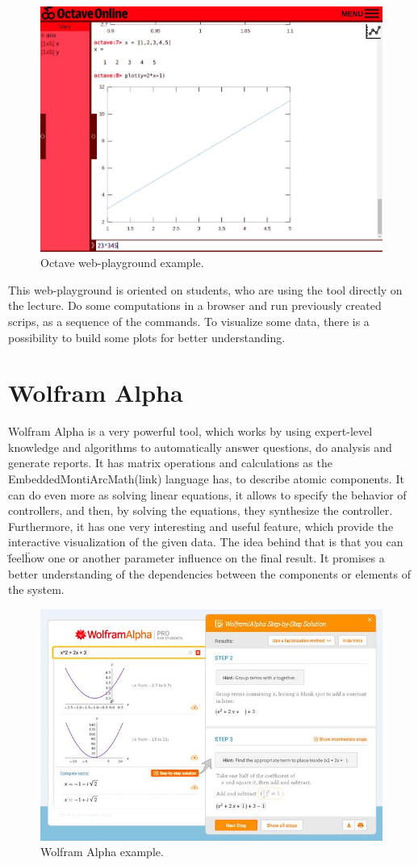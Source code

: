 \begin{figure}[h!]
    \centering
    \includegraphics[width=0.7\linewidth]{src/pic/octave}
    \caption{Octave web-playground example.}
    \label{fig:octave}
\end{figure}

This web-playground is oriented on students, who are using the tool directly on the lecture. Do some computations in a browser and run previously created scrips, as a sequence of the commands. To visualize some data, there is a possibility to build some plots for better understanding.

\section{Wolfram Alpha} \label{sec:wolfram}
Wolfram Alpha is a very powerful tool, which works by using expert-level knowledge and algorithms to automatically answer questions, do analysis and generate reports. It has matrix operations and calculations as the EmbeddedMontiArcMath(link) language has, to describe atomic components. It can do even more as solving linear equations, it allows to specify the behavior of controllers, and then, by solving the equations, they synthesize the controller. Furthermore, it has one very interesting and useful feature, which provide the interactive visualization of the given data. The idea behind that is that you can \"feel\" how one or another parameter influence on the final result. It promises a better understanding of the dependencies between the components or elements of the system.

\begin{figure}[h!]
    \centering
    \includegraphics[width=0.7\linewidth]{src/pic/wolfram}
    \caption{Wolfram Alpha example.}
    \label{fig:wolfram}
\end{figure}

